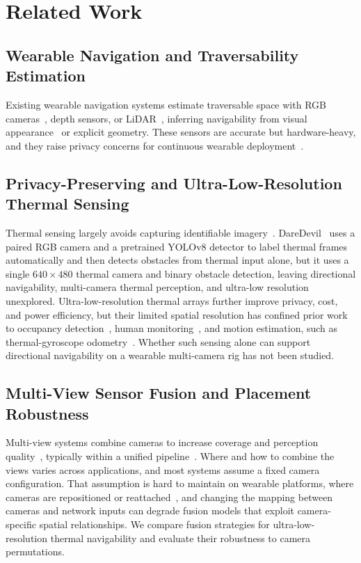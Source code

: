 \section{Related Work}

\subsection{Wearable Navigation and Traversability Estimation}
Existing wearable navigation systems estimate traversable space with RGB
cameras~\cite{11540071}, depth sensors, or LiDAR~\cite{Liu_2021_ICCV},
inferring navigability from visual appearance~\cite{muDynamicObstacleAvoidance2024}
or explicit geometry. These sensors are accurate but hardware-heavy, and they
raise privacy concerns for continuous wearable
deployment~\cite{rinta-homiHowLowCan2021}.

\subsection{Privacy-Preserving and Ultra-Low-Resolution Thermal Sensing}
Thermal sensing largely avoids capturing identifiable imagery~\cite{rinta-homiHowLowCan2021,papagianopoulos2023obstacle}.
DareDevil~\cite{gaoDeployablePrivacyPreservingThermalBased2025} uses a paired
RGB camera and a pretrained YOLOv8 detector to label thermal frames
automatically and then detects obstacles from thermal input alone, but it uses
a single $640\times480$ thermal camera and binary obstacle detection, leaving
directional navigability, multi-camera thermal perception, and ultra-low
resolution unexplored. Ultra-low-resolution thermal arrays further improve
privacy, cost, and power efficiency, but their limited spatial resolution has
confined prior work to occupancy detection~\cite{rinta-homiHowLowCan2021},
human monitoring~\cite{rezaeiUnobtrusiveHumanActivity2023}, and motion
estimation, such as thermal-gyroscope
odometry~\cite{mohsenDeepFusionUltraLowResolution2025}. Whether such sensing
alone can support directional navigability on a wearable multi-camera rig has
not been studied.

\subsection{Multi-View Sensor Fusion and Placement Robustness}
Multi-view systems combine cameras to increase coverage and perception
quality~\cite{zhuAutonomousRobotNavigation2020,olagokeLiteratureSurveyMultiCamera2020},
typically within a unified pipeline~\cite{Zheng_2023_WACV}. Where and how to
combine the views varies across applications, and most systems assume a fixed
camera configuration. That assumption is hard to maintain on
wearable platforms, where cameras are repositioned or
reattached~\cite{kuoRedesigningSLAMArbitrary2020}, and changing the mapping
between cameras and network inputs can degrade fusion models that exploit
camera-specific spatial relationships. We compare fusion strategies for
ultra-low-resolution thermal navigability and evaluate their robustness to
camera permutations.

